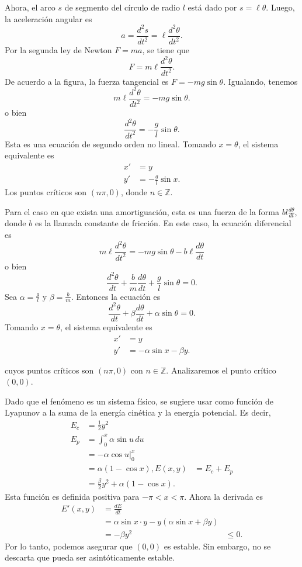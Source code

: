 \documentclass[11pt,letterpaper,draft]{report}
\newcommand\Z{\mathbb Z}
\newcommand\<{\langle}
\renewcommand\>{\rangle}
\begin{document}
Ahora, el arco $s$ de segmento del círculo de radio $l$ está dado por
$s=\ell\theta$.
Luego, la aceleración angular es
\[
  a=\frac{d^{2}s}{dt^{2}} = \ell \frac{d^{2}\theta}{dt^{2}}
.\]
Por la segunda ley de Newton $F=ma$, se tiene que
\[
  F=m\ell\frac{d^{2}\theta}{dt^{2}}
.\]
De acuerdo a la figura, la fuerza tangencial es $F=-mg\sin\theta$.
Igualando, tenemos
\[
  m\ell\frac{d^{2}\theta}{dt^{2}} = -mg\sin\theta
.\]
o bien
\[
  \boxed{
  \frac{d^{2}\theta}{dt^{2}} = -\frac{g}{l}\sin\theta
  .}
\]
Esta es una ecuación de segundo orden no lineal.
Tomando $x=\theta$, el sistema equivalente es
\begin{align*}
  x' &= y \\
  y' &= -\frac{g}{l}\sin x.
\end{align*}
Los puntos críticos son $(n\pi,0)$, donde $n\in\Z$.

Para el caso en que exista una amortiguación, esta es una fuerza de la
forma $bl\frac{d\theta}{dt}$, donde $b$ es la llamada constante de
fricción.
En este caso, la ecuación diferencial es
\[
  m\ell\frac{d^{2}\theta}{dt^{2}} =
  -mg\sin\theta-b\ell\frac{d\theta}{dt}
\]
o bien
\[
  \frac{d^{2}\theta}{dt}+\frac{b}{m}\frac{d\theta}{dt}
  +\frac{g}{l}\sin\theta = 0
.\]
Sea $\alpha=\frac{g}{l}$ y $\beta=\frac{b}{m}$. Entonces la ecuación
es
\[
  \boxed{
    \frac{d^{2}\theta}{dt}+\beta\frac{d\theta}{dt}
    +\alpha\sin\theta = 0
  .}
\]
Tomando $x=\theta$, el sistema equivalente es
\begin{align*}
  x' &= y \\
  y' &= -\alpha\sin x-\beta y.
\end{align*}

cuyos puntos críticos son $(n\pi,0)$ con $n\in\Z$.
Analizaremos el punto crítico $(0,0)$.

Dado que el fenómeno es un sistema físico, se sugiere usar como
función de Lyapunov a la suma de la energía cinética y la energía
potencial. Es decir,
\begin{align*}
  E_c &= \frac{1}{2}y^{2} \\
  E_p &= \int_{0}^{x}\alpha\sin u\,du \\
      &= -\alpha\cos u \Big|_{0}^{x} \\
      &= \alpha(1-\cos x),
  E(x,y) &= E_c+E_p \\
         &= \frac{\beta}{2}y^{2} + \alpha(1-\cos x).
\end{align*}
Esta función es definida positiva para $-\pi<x<\pi$.
Ahora la derivada es
\begin{align*}
  E'(x,y)
  &= \frac{dE}{dt} \\
  &= \alpha\sin x \cdot y - y(\alpha\sin x+\beta y) \\
  &= -\beta y^{2}
  &\leq 0.
\end{align*}
Por lo tanto, podemos asegurar que $(0,0)$ es estable. Sin embargo, no
se descarta que pueda ser asintóticamente estable.
\end{document}
